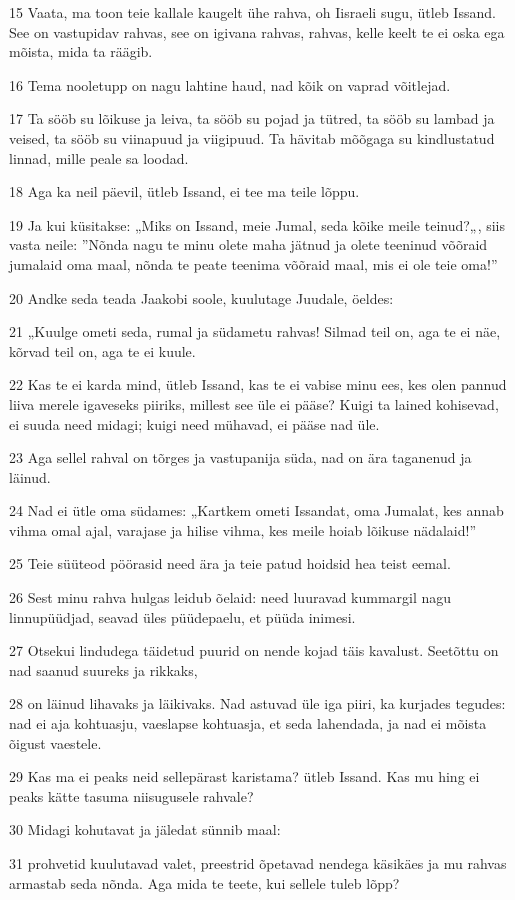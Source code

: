 \par 15 Vaata, ma toon teie kallale kaugelt ühe rahva, oh Iisraeli sugu, ütleb Issand. See on vastupidav rahvas, see on igivana rahvas, rahvas, kelle keelt te ei oska ega mõista, mida ta räägib.
\par 16 Tema nooletupp on nagu lahtine haud, nad kõik on vaprad võitlejad.
\par 17 Ta sööb su lõikuse ja leiva, ta sööb su pojad ja tütred, ta sööb su lambad ja veised, ta sööb su viinapuud ja viigipuud. Ta hävitab mõõgaga su kindlustatud linnad, mille peale sa loodad.
\par 18 Aga ka neil päevil, ütleb Issand, ei tee ma teile lõppu.
\par 19 Ja kui küsitakse: „Miks on Issand, meie Jumal, seda kõike meile teinud?„, siis vasta neile: ”Nõnda nagu te minu olete maha jätnud ja olete teeninud võõraid jumalaid oma maal, nõnda te peate teenima võõraid maal, mis ei ole teie oma!”
\par 20 Andke seda teada Jaakobi soole, kuulutage Juudale, öeldes:
\par 21 „Kuulge ometi seda, rumal ja südametu rahvas! Silmad teil on, aga te ei näe, kõrvad teil on, aga te ei kuule.
\par 22 Kas te ei karda mind, ütleb Issand, kas te ei vabise minu ees, kes olen pannud liiva merele igaveseks piiriks, millest see üle ei pääse? Kuigi ta lained kohisevad, ei suuda need midagi; kuigi need mühavad, ei pääse nad üle.
\par 23 Aga sellel rahval on tõrges ja vastupanija süda, nad on ära taganenud ja läinud.
\par 24 Nad ei ütle oma südames: „Kartkem ometi Issandat, oma Jumalat, kes annab vihma omal ajal, varajase ja hilise vihma, kes meile hoiab lõikuse nädalaid!”
\par 25 Teie süüteod pöörasid need ära ja teie patud hoidsid hea teist eemal.
\par 26 Sest minu rahva hulgas leidub õelaid: need luuravad kummargil nagu linnupüüdjad, seavad üles püüdepaelu, et püüda inimesi.
\par 27 Otsekui lindudega täidetud puurid on nende kojad täis kavalust. Seetõttu on nad saanud suureks ja rikkaks,
\par 28 on läinud lihavaks ja läikivaks. Nad astuvad üle iga piiri, ka kurjades tegudes: nad ei aja kohtuasju, vaeslapse kohtuasja, et seda lahendada, ja nad ei mõista õigust vaestele.
\par 29 Kas ma ei peaks neid sellepärast karistama? ütleb Issand. Kas mu hing ei peaks kätte tasuma niisugusele rahvale?
\par 30 Midagi kohutavat ja jäledat sünnib maal:
\par 31 prohvetid kuulutavad valet, preestrid õpetavad nendega käsikäes ja mu rahvas armastab seda nõnda. Aga mida te teete, kui sellele tuleb lõpp?

